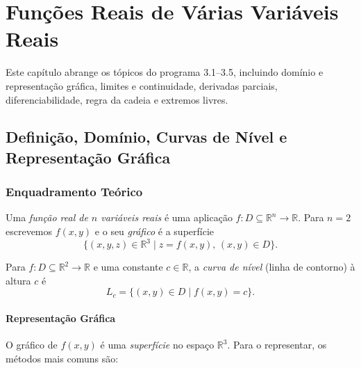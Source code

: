 
\chapter{Funções Reais de Várias Variáveis Reais}

Este capítulo abrange os tópicos do programa 3.1--3.5, incluindo domínio e
representação gráfica, limites e continuidade, derivadas parciais,
diferenciabilidade, regra da cadeia e extremos livres.

\section{Definição, Domínio, Curvas de Nível e Representação Gráfica}

\subsection{Enquadramento Teórico}

\begin{defbox}[title={Função Real de Várias Variáveis}]
  Uma \emph{função real de $n$ variáveis reais} é uma aplicação
  $f: D \subseteq \mathbb{R}^n \to \mathbb{R}$.
  Para $n=2$ escrevemos $f(x,y)$ e o seu \emph{gráfico} é a superfície
  \[
    \{(x,y,z)\in\mathbb{R}^3 \mid z = f(x,y),\, (x,y)\in D\}.
  \]
\end{defbox}

\begin{defbox}[title={Curva de Nível (Linha de Contorno)}]
  Para $f:D\subseteq\mathbb{R}^2\to\mathbb{R}$ e uma constante $c\in\mathbb{R}$,
  a \emph{curva de nível} (linha de contorno) à altura $c$ é
  \[
    L_c = \{(x,y)\in D \mid f(x,y) = c\}.
  \]
\end{defbox}

\subsubsection*{Representação Gráfica}

O gráfico de $f(x,y)$ é uma \emph{superfície} no espaço $\mathbb{R}^3$.
Para o representar, os métodos mais comuns são:

